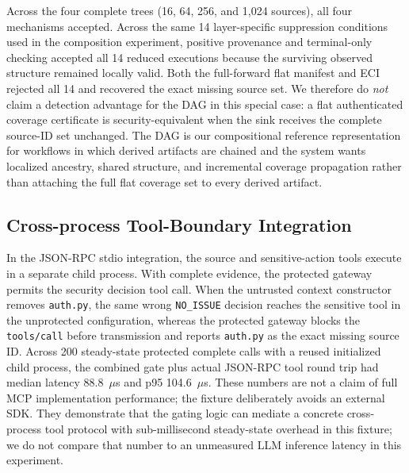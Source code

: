 \documentclass[journal,compsoc]{IEEEtran}
\begin{document}
Across the four complete trees (16, 64, 256, and 1,024 sources), all four mechanisms accepted. Across the same 14 layer-specific suppression conditions used in the composition experiment, positive provenance and terminal-only checking accepted all 14 reduced executions because the surviving observed structure remained locally valid. Both the full-forward flat manifest and ECI rejected all 14 and recovered the exact missing source set. We therefore do \emph{not} claim a detection advantage for the DAG in this special case: a flat authenticated coverage certificate is security-equivalent when the sink receives the complete source-ID set unchanged. The DAG is our compositional reference representation for workflows in which derived artifacts are chained and the system wants localized ancestry, shared structure, and incremental coverage propagation rather than attaching the full flat coverage set to every derived artifact.

\begin{table}[t]
\centering
\caption{Coverage-representation ablation on transformed multi-stage evidence. The flat-manifest row forwards the complete source-ID coverage set unchanged; ECI represents the same completeness property compositionally through the evidence DAG.}
\label{tab:mechanism-ablation}
\small
{}
\end{table}

\subsection{Cross-process Tool-Boundary Integration}
In the JSON-RPC stdio integration, the source and sensitive-action tools execute in a separate child process. With complete evidence, the protected gateway permits the security decision tool call. When the untrusted context constructor removes \texttt{auth.py}, the same wrong \texttt{NO\_ISSUE} decision reaches the sensitive tool in the unprotected configuration, whereas the protected gateway blocks the \texttt{tools/call} before transmission and reports \texttt{auth.py} as the exact missing source ID. Across 200 steady-state protected complete calls with a reused initialized child process, the combined gate plus actual JSON-RPC tool round trip had median latency 88.8~$\mu$s and p95 104.6~$\mu$s. These numbers are not a claim of full MCP implementation performance; the fixture deliberately avoids an external SDK. They demonstrate that the gating logic can mediate a concrete cross-process tool protocol with sub-millisecond steady-state overhead in this fixture; we do not compare that number to an unmeasured LLM inference latency in this experiment.
\end{document}
